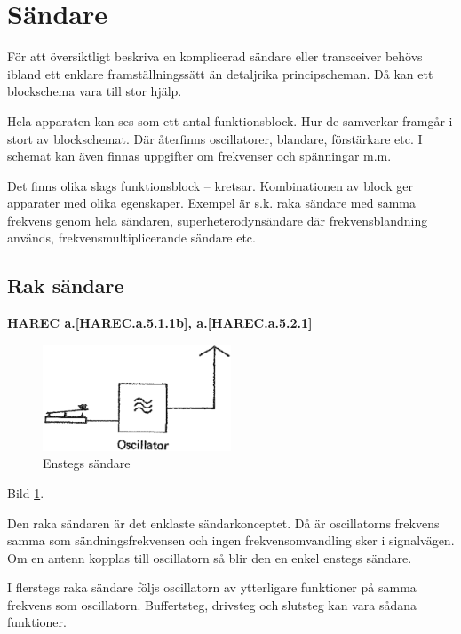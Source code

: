\section{Sändare}
\label{sändare}

För att översiktligt beskriva en komplicerad sändare eller transceiver
behövs ibland ett enklare framställningssätt än detaljrika
principscheman. Då kan ett blockschema vara till stor hjälp.

Hela apparaten kan ses som ett antal funktionsblock. Hur de samverkar
framgår i stort av blockschemat. Där återfinns oscillatorer, blandare,
förstärkare etc. I schemat kan även finnas uppgifter om frekvenser och
spänningar m.m.

Det finns olika slags funktionsblock -- kretsar. Kombinationen av block
ger apparater med olika egenskaper. Exempel är s.k. raka sändare med
samma frekvens genom hela sändaren, superheterodynsändare där
frekvensblandning används, frekvensmultiplicerande sändare etc.

\subsection{Rak sändare}
\textbf{
HAREC a.\ref{HAREC.a.5.1.1b}\label{myHAREC.a.5.1.1b},
 a.\ref{HAREC.a.5.2.1}\label{myHAREC.a.5.2.1}
}

\begin{figure}
  \includegraphics[width=0.5\textwidth]{images/cropped_pdfs/bild_2_5-01.pdf}
  \caption{Enstegs sändare}
  \label{fig:bildII5-1}
\end{figure}

Bild \ref{fig:bildII5-1}.

Den raka sändaren är det enklaste sändarkonceptet. Då är oscillatorns
frekvens samma som sändningsfrekvensen och ingen frekvensomvandling
sker i signalvägen. Om en antenn kopplas till oscillatorn så blir den
en enkel enstegs sändare.

I flerstegs raka sändare följs oscillatorn av ytterligare funktioner
på samma frekvens som oscillatorn. Buffertsteg, drivsteg och slutsteg
kan vara sådana funktioner.

